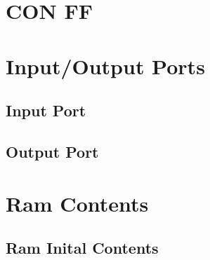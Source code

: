 \documentclass{article}
\begin{document}
\section{CON FF} \label{con_ff.v}
     
\section{Input/Output Ports}
    \subsection{Input Port} \label{inputPort.v}
        
    \subsection{Output Port} \label{outputPort.v}
        
    
\section{Ram Contents}
    \subsection{Ram Inital Contents} \label{ram_init}
        
\end{document}
